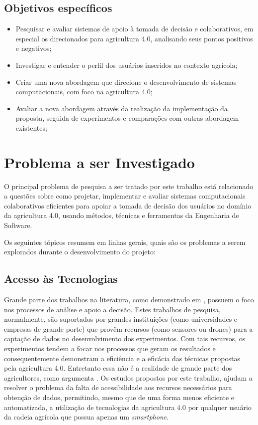 \documentclass[12pt]{article}
\begin{document}
\subsection{Objetivos específicos}
\label{subsec:objetivos_especificos}

\begin{itemize}
	\item Pesquisar e avaliar sistemas de apoio à tomada de decisão e colaborativos, em especial os direcionados para agricultura 4.0, analisando seus pontos positivos e negativos;
	\item Investigar e entender o perfil dos usuários inseridos no contexto agrícola;
	\item Criar uma nova abordagem que direcione o desenvolvimento de sistemas computacionais, com foco na agricultura 4.0;
	\item Avaliar a nova abordagem através da realização da implementação da proposta, seguida de experimentos e comparações com outras abordagem existentes;
\end{itemize}

\section{Problema a ser Investigado}
\label{sec:problema_investigado}

O principal problema de pesquisa a ser tratado por este trabalho está relacionado a questões sobre como projetar, implementar e avaliar sistemas computacionais colaborativos eficientes para apoiar a tomada de decisão dos usuários no domínio da agricultura 4.0, usando métodos, técnicas e ferramentas da Engenharia de Software.

Os seguintes tópicos resumem em linhas gerais, quais são os problemas a serem explorados durante o desenvolvimento do projeto:

\subsection{Acesso às Tecnologias}
\label{subsec:acesso_tecnologias}

Grande parte dos trabalhos na literatura, como demonstrado em \cite{Massruha:2017}, possuem o foco nos processos de análise e apoio a decisão. Estes trabalhos de pesquisa, normalmente, são suportados por grandes instituições (como universidades e empresas de grande porte) que provêm recursos (como sensores ou drones) para a captação de dados no desenvolvimento dos experimentos. Com tais recursos, os experimentos tendem a focar nos processos que geram os resultados e consequentemente demonstram a eficiência e a eficácia das técnicas propostas pela agricultura 4.0. Entretanto essa não é a realidade de grande parte dos agricultores, como argumenta \cite{Rose:2019}. Os estudos propostos por este trabalho, ajudam a resolver o problema da falta de acessibilidade aos recursos necessários para obtenção de dados, permitindo, mesmo que de uma forma menos eficiente e automatizada, a utilização de tecnologias da agricultura 4.0 por qualquer usuário da cadeia agrícola que possua apenas um \textit{smartphone}.
\end{document}
